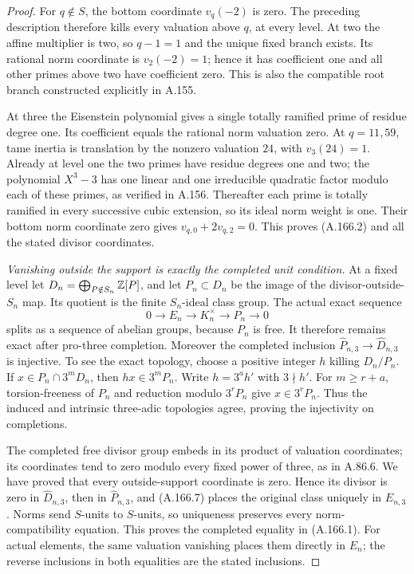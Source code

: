 \begin{proof}
For \(q\notin S\), the bottom coordinate \(v_q(-2)\) is zero.
The preceding description therefore kills every valuation above
\(q\), at every level.  At two the affine multiplier is two, so
\(q-1=1\) and the unique fixed branch exists.  Its rational norm
coordinate is \(v_2(-2)=1\); hence it has coefficient one and all
other primes above two have coefficient zero.  This is also the
compatible root branch constructed explicitly in A.155.

At three the Eisenstein polynomial gives a single totally ramified
prime of residue degree one.  Its coefficient equals the rational
norm valuation zero.  At \(q=11,59\), tame inertia is translation
by the nonzero valuation \(24\), with \(v_3(24)=1\).
Already at level one the two primes have residue degrees one and
two; the polynomial \(X^3-3\) has one linear and one irreducible
quadratic factor modulo each of these primes, as verified in A.156.
Thereafter each prime is totally ramified in every successive
cubic extension, so its ideal norm weight is one.  Their bottom
norm coordinate zero gives \(v_{q,0}+2v_{q,2}=0\).
This proves (A.166.2) and all the stated divisor coordinates.

\emph{Vanishing outside the support is exactly the completed unit condition.}
At a fixed level let
\(D_n=\bigoplus_{P\notin S_n}\mathbb Z[P]\), and let
\(P_n\subset D_n\) be the image of the divisor-outside-\(S_n\)
map.  Its quotient is the finite \(S_n\)-ideal class group.
The actual exact sequence
\[
                 0\longrightarrow E_n\longrightarrow K_n^\times
                           \longrightarrow P_n\longrightarrow0
\tag{A.166.7}
\]
splits as a sequence of abelian groups, because \(P_n\) is free.
It therefore remains exact after pro-three completion.
Moreover the completed inclusion \(\widehat P_{n,3}\to
\widehat D_{n,3}\) is injective.  To see the exact topology, choose
a positive integer \(h\) killing \(D_n/P_n\).  If
\(x\in P_n\cap3^mD_n\), then
\(hx\in3^mP_n\).  Write \(h=3^a h'\) with \(3\nmid h'\).
For \(m\ge r+a\), torsion-freeness of \(P_n\) and reduction
modulo \(3^rP_n\) give \(x\in3^rP_n\).
Thus the induced and intrinsic three-adic topologies agree, proving
the injectivity on completions.

The completed free divisor group embeds in its product of valuation
coordinates; its coordinates tend to zero modulo every fixed power
of three, as in A.86.6.  We have proved that every outside-support
coordinate is zero.  Hence its divisor is zero in
\(\widehat D_{n,3}\), then in \(\widehat P_{n,3}\), and
(A.166.7) places the original class uniquely in
\(\widehat E_{n,3}\).  Norms send \(S\)-units to \(S\)-units,
so uniqueness preserves every norm-compatibility equation.  This
proves the completed equality in (A.166.1).  For actual elements,
the same valuation vanishing places them directly in \(E_n\);
the reverse inclusions in both equalities are the stated inclusions.


\end{proof}
